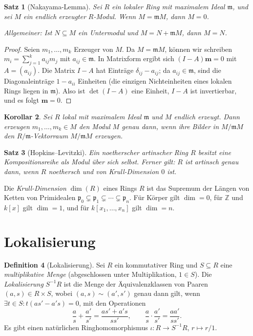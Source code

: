 \documentclass[12pt,a4paper]{amsart}
\newtheorem{theorem}{Satz}[section]
\newtheorem{corollary}[theorem]{Korollar}
\theoremstyle{definition}
\newtheorem{definition}[theorem]{Definition}
\theoremstyle{definition}
\begin{document}
\begin{theorem}[Nakayama-Lemma]\label{satz:nakayama}
Sei $R$ ein lokaler Ring mit maximalem Ideal $\mathfrak{m}$, und sei $M$ ein
endlich erzeugter $R$-Modul. Wenn $M = \mathfrak{m}M$, dann $M = 0$.

Allgemeiner: Ist $N \subseteq M$ ein Untermodul und $M = N + \mathfrak{m}M$,
dann $M = N$.
\end{theorem}

\begin{proof}
Seien $m_1,\ldots,m_k$ Erzeuger von $M$. Da $M = \mathfrak{m}M$, können wir schreiben
$m_i = \sum_{j=1}^k a_{ij} m_j$ mit $a_{ij} \in \mathfrak{m}$.
In Matrixform ergibt sich $(I - A)\mathbf{m} = 0$ mit $A = (a_{ij})$.
Die Matrix $I - A$ hat Einträge $\delta_{ij} - a_{ij}$; da $a_{ij} \in \mathfrak{m}$,
sind die Diagonaleinträge $1 - a_{ii}$ Einheiten (die einzigen Nichteinheiten eines
lokalen Rings liegen in $\mathfrak{m}$). Also ist $\det(I-A)$ eine Einheit,
$I-A$ ist invertierbar, und es folgt $\mathbf{m} = 0$.
\end{proof}

\begin{corollary}
Sei $R$ lokal mit maximalem Ideal $\mathfrak{m}$ und $M$ endlich erzeugt.
Dann erzeugen $m_1,\ldots,m_k \in M$ den Modul $M$ genau dann, wenn ihre Bilder
in $M/\mathfrak{m}M$ den $R/\mathfrak{m}$-Vektorraum $M/\mathfrak{m}M$ erzeugen.
\end{corollary}

\begin{theorem}[Hopkins--Levitzki]
Ein noetherscher artinscher Ring $R$ besitzt eine Kompositionsreihe als Modul über
sich selbst. Ferner gilt: $R$ ist artinsch genau dann, wenn $R$ noethersch und von
Krull-Dimension $0$ ist.
\end{theorem}

Die \emph{Krull-Dimension} $\dim(R)$ eines Rings $R$ ist das Supremum der Längen
von Ketten von Primidealen $\mathfrak{p}_0 \subsetneq \mathfrak{p}_1 \subsetneq \cdots
\subsetneq \mathfrak{p}_n$. Für Körper gilt $\dim = 0$, für $\mathbb{Z}$ und $k[x]$
gilt $\dim = 1$, und für $k[x_1,\ldots,x_n]$ gilt $\dim = n$.

\section{Lokalisierung}

\begin{definition}[Lokalisierung]
Sei $R$ ein kommutativer Ring und $S \subseteq R$ eine \emph{multiplikative Menge}
(abgeschlossen unter Multiplikation, $1 \in S$). Die \emph{Lokalisierung}
$S^{-1}R$ ist die Menge der Äquivalenzklassen von Paaren $(a, s) \in R \times S$,
wobei $(a,s) \sim (a',s')$ genau dann gilt, wenn $\exists t \in S: t(as' - a's) = 0$,
mit den Operationen
\[
  \frac{a}{s} + \frac{a'}{s'} = \frac{as' + a's}{ss'}, \qquad
  \frac{a}{s} \cdot \frac{a'}{s'} = \frac{aa'}{ss'}.
\]
Es gibt einen natürlichen Ringhomomorphismus $\iota\colon R \to S^{-1}R$, $r \mapsto r/1$.
\end{definition}
\end{document}
